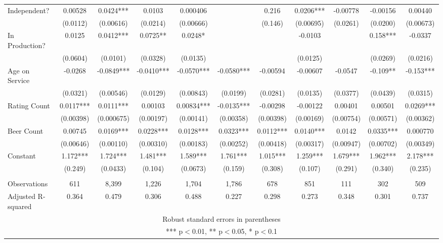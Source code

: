 \begin{tabular}{lcccccccccc}
   Independent? & 0.00528 & 0.0424*** & 0.0103 & 0.000406 &  & 0.216 & 0.0206*** & -0.00778 & -0.00156 & 0.00440 \\
    & (0.0112) & (0.00616) & (0.0214) & (0.00666) &  & (0.146) & (0.00695) & (0.0261) & (0.0200) & (0.00673) \\
   In Production? & 0.0125 & 0.0412*** & 0.0725** & 0.0248* &  &  & -0.0103 &  & 0.158*** & -0.0337 \\
    & (0.0604) & (0.0101) & (0.0328) & (0.0135) &  &  & (0.0125) &  & (0.0269) & (0.0216) \\
   Age on Service & -0.0268 & -0.0849*** & -0.0410*** & -0.0570*** & -0.0580*** & -0.00594 & -0.00607 & -0.0547 & -0.109** & -0.153*** \\
    & (0.0321) & (0.00546) & (0.0129) & (0.00843) & (0.0199) & (0.0281) & (0.0135) & (0.0377) & (0.0439) & (0.0315) \\
   Rating Count & 0.0117*** & 0.0111*** & 0.00103 & 0.00834*** & -0.0135*** & -0.00298 & -0.00122 & 0.00401 & 0.00501 & 0.0269*** \\
    & (0.00398) & (0.000675) & (0.00197) & (0.00141) & (0.00358) & (0.00398) & (0.00169) & (0.00754) & (0.00571) & (0.00362) \\
   Beer Count & 0.00745 & 0.0169*** & 0.0228*** & 0.0128*** & 0.0323*** & 0.0112*** & 0.0140*** & 0.0142 & 0.0335*** & 0.000770 \\
    & (0.00646) & (0.00110) & (0.00310) & (0.00183) & (0.00252) & (0.00418) & (0.00317) & (0.00947) & (0.00702) & (0.00349) \\
   Constant & 1.172*** & 1.724*** & 1.481*** & 1.589*** & 1.761*** & 1.015*** & 1.259*** & 1.679*** & 1.962*** & 2.178*** \\
    & (0.249) & (0.0433) & (0.104) & (0.0673) & (0.159) & (0.308) & (0.107) & (0.291) & (0.340) & (0.235) \\
    &  &  &  &  &  &  &  &  &  &  \\
   Observations & 611 & 8,399 & 1,226 & 1,704 & 1,786 & 678 & 851 & 111 & 302 & 509 \\
    Adjusted R-squared & 0.364 & 0.479 & 0.306 & 0.488 & 0.227 & 0.298 & 0.273 & 0.348 & 0.301 & 0.737 \\ \hline
   \multicolumn{11}{c}{ Robust standard errors in parentheses} \\
   \multicolumn{11}{c}{ *** p$<$0.01, ** p$<$0.05, * p$<$0.1} \\
   \end{tabular}